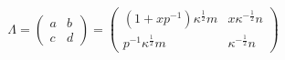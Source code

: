 \begin{equation}
\Lambda = \left(
\begin{array}{cc}
a & b \\
c & d
\end{array}  \right) =\left(
\begin{array}{cc}
(1+x p^{-1})\kappa^{\frac{1}{2}} m & x\kappa^{-\frac{1}{2}} n \\
p^{-1}\kappa^{\frac{1}{2}} m & \kappa^{-\frac{1}{2}}n
\end{array} \right)
\end{equation}

